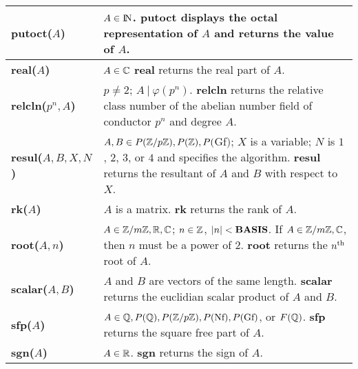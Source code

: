 {\newpage

\begin{tabular}{|p{1.95in}|p{3.83in}|} \hline

{\bf putoct($A$)} &
$A\in {\rm{I\!N}}$. \newline
{\bf putoct} displays the octal representation of $A$ and returns the 
value of $A$. \\ \hline

{\bf real($A$)} &
$A \in \mbox{$\mathbb C$}$\newline
{\bf real} returns the real part of $A$.\\ \hline

{\bf relcln($p^n,A$)} &
$p\not= 2$; $A\ |\ \varphi(p^n)$.\newline
{\bf relcln} returns the relative class number of the abelian number
field of conductor $p^n$ and degree $A$. \\ \hline

{\bf resul($A,B,X,N$)} &
$A, B \in P(\mbox{$\mathbb Z$}/p\mbox{$\mathbb Z$}), P(\mbox{$\mathbb Z$}), P($Gf$)$; $X$ is a variable; \newline
$N$ is $1$, $2$, $3$, or $4$ and specifies the algorithm.\newline
{\bf resul} returns the resultant of $A$ and $B$ with respect to $X$. \\ \hline

{\bf rk($A$)} &
$A$ is a matrix.\newline
{\bf rk} returns the rank of $A$. \\ \hline

{\bf root($A,n$)} &
$A \in \mbox{$\mathbb Z$}/m\mbox{$\mathbb Z$}, \mbox{$\mathbb R$}, \mbox{$\mathbb C$}$; $n \in \mbox{$\mathbb Z$}$, $|n| < {\rm {\bf BASIS}}$.\newline
If $A \in \mbox{$\mathbb Z$}/m\mbox{$\mathbb Z$}, \mbox{$\mathbb C$}$, then $n$ must be a power of $2$.\newline
{\bf root} returns the $n^{\rm th}$ root of $A$.\\ \hline

{\bf scalar($A,B$)} &
$A$ and $B$ are vectors of the same length.\newline
{\bf scalar} returns the euclidian scalar product of $A$ and $B$.\\ \hline

{\bf sfp($A$)} &
$A \in \mbox{$\mathbb Q$}, P(\mbox{$\mathbb Q$}), P(\mbox{$\mathbb Z$}/p\mbox{$\mathbb Z$}), P(\mbox{Nf}), P(\mbox{Gf})$, or $F(\mbox{$\mathbb Q$})$.\newline
{\bf sfp} returns the square free part of $A$.\\ \hline

{\bf sgn($A$)} &
$A \in \mbox{$\mathbb R$}$.\newline
{\bf sgn} returns the sign of $A$.\\ \hline


\end{tabular}}
